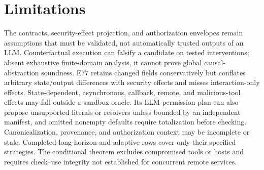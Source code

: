 \section{Limitations}

The contracts, security-effect projection, and authorization envelopes remain assumptions that must be validated, not automatically trusted outputs of an LLM. Counterfactual execution can falsify a candidate on tested interventions; absent exhaustive finite-domain analysis, it cannot prove global causal-abstraction soundness. E77 retains changed fields conservatively but conflates arbitrary state/output differences with security effects and misses interaction-only effects. State-dependent, asynchronous, callback, remote, and malicious-tool effects may fall outside a sandbox oracle. Its LLM permission plan can also propose unsupported literals or resolvers unless bounded by an independent manifest, and omitted nonempty defaults require totalization before checking. Canonicalization, provenance, and authorization context may be incomplete or stale. Completed long-horizon and adaptive rows cover only their specified strategies. The conditional theorem excludes compromised tools or hosts and requires check--use integrity not established for concurrent remote services.
